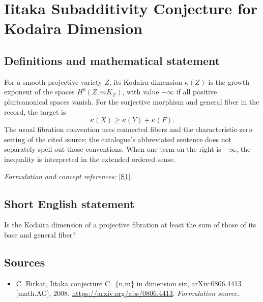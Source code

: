 \documentclass[11pt]{article}
\begin{document}
\section*{\texorpdfstring{Iitaka Subadditivity Conjecture for Kodaira Dimension}{Iitaka Subadditivity Conjecture for Kodaira Dimension}}\label{30005168}
\subsection{Definitions and mathematical statement}
For a smooth projective variety $Z$, its Kodaira dimension $\kappa(Z)$ is the growth exponent of the spaces $H^0(Z,mK_Z)$, with value $-\infty$ if all positive pluricanonical spaces vanish. For the surjective morphism and general fiber in the record, the target is
\[
 \kappa(X)\ge\kappa(Y)+\kappa(F).
\]
The usual fibration convention uses connected fibers and the characteristic-zero setting of the cited source; the catalogue's abbreviated sentence does not separately spell out those conventions. When one term on the right is $-\infty$, the inequality is interpreted in the extended ordered sense.
\par\smallskip\textit{Formulation and concept references:} \href{https://arxiv.org/abs/0806.4413}{[S1]}.

\subsection{Short English statement}
Is the Kodaira dimension of a projective fibration at least the sum of those of its base and general fiber?
\subsection{Sources}
\begin{itemize}
\item[S1]C. Birkar, Iitaka conjecture C\_\{n,m\} in dimension six, arXiv:0806.4413 [math.AG], 2008.
\url{https://arxiv.org/abs/0806.4413}.
\textit{Formulation source.}
\end{itemize}
\end{document}
